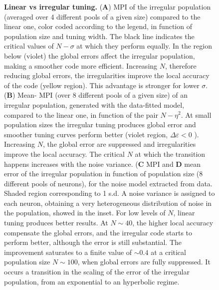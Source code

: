 \documentclass[a4paper]{article}%
\begin{document}
\begin{figure}[ptb]
\centering
{}\caption{\textbf{Linear vs
irregular tuning.} (\textbf{A}) MPI of the irregular population (averaged over
4 different pools of a given size) compared to the linear one, color coded
according to the legend, in function of population size and tuning width. The
black line indicates the critical values of $N-\sigma$ at which they perform
equally. In the region below (violet) the global errors affect the irregular
population, making a smoother code more efficient. Increasing $N$,
therefore reducing global errors, the irregularities improve the local
accuracy of the code (yellow region). This advantage is stronger for lower
$\sigma$.  (\textbf{B}) Mean- MPI (over 8 different pools of a given size) of
an irregular population, generated with the data-fitted model, compared to the
linear one, in function of the pair $N-\eta^{2}$. At small population sizes
the irregular tuning produces global error and smoother tuning curves perform
better (violet region, $\Delta\varepsilon<0 $ ). Increasing $N$, the global
error are suppressed and irregularities improve the local accuracy. The
critical $N$ at which the transition happens increases with the noise
variance. (\textbf{C} MPI and  \textbf{D} mean error of the irregular population in function of population size (8
different pools of neurons), for the noise model extracted from data. Shaded
region corresponding to 1 s.d. A noise variance is assigned to each neuron,
obtaining a very heterogeneous distribution of noise in the population, showed
in the inset. For low levels of $N$, linear tuning produces better results.
At $N\sim40$, the higher local accuracy compensate the global errors,
and the irregular code starts to perform better, although the error is still substantial. The improvement saturates to
a finite value of $\sim0.4$ at a critical population size  $N\sim100$, when
global errors are fully suppressed. It occurs a transition in the scaling of the error of the irregular population, from an exponential to an hyperbolic regime.}
\label{Fig:6}
\end{figure}\clearpage
\end{document}
